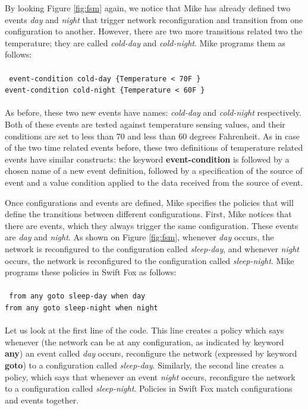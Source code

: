 \documentclass[11pt]{article}
\begin{document}
By looking Figure \ref{fig:fsm} again, we notice that Mike has already
defined two events \textit{day} and \textit{night} that trigger network
reconfiguration and transition from one configuration to another. However, 
there are two more transitions related two the temperature; they are called
\textit{cold-day} and \textit{cold-night}. Mike programs them as follows:\\
\\
\texttt{
event-condition cold-day \{Temperature < 70F \}				\\
event-condition cold-night \{Temperature < 60F \}			\\
}\\
As before, these two new events have names: \textit{cold-day} and
\textit{cold-night} respectively. Both of these events are tested against
temperature sensing values, and their conditions are set to less than 70
and less than 60 degrees Fahrenheit. As in case of the two time related
events before, these two definitions of temperature related events have
similar constructs: the keyword \textbf{event-condition} is followed by a
chosen name of a new event definition, followed by a specification of the
source of event and a value condition applied to the data received from the
source of event.

Once configurations and events are defined, Mike specifies the policies
that will define the transitions between different configurations. First,
Mike notices that there are events, which they always trigger the same
configuration. These events are \textit{day} and \textit{night}. As shown
on Figure \ref{fig:fsm}, whenever \textit{day} occurs, the network is
reconfigured to the configuration called \textit{sleep-day}, and whenever
\textit{night} occurs, the network is reconfigured to the configuration
called \textit{sleep-night}. Mike programs these policies in Swift Fox as
follows:								\\
\\
\texttt{
from any goto sleep-day when day					\\
from any goto sleep-night when night					\\
}\\
Let us look at the first line of the code. This line creates a policy which
says whenever (the network can be at any configuration, as indicated by
keyword \textbf{any}) an event called \textit{day} occurs, reconfigure the 
network (expressed by keyword \textbf{goto}) to a configuration called
\textit{sleep-day}. Similarly, the second line creates a policy, which says
that whenever an event \textit{night} occurs, reconfigure the network to a 
configuration called \textit{sleep-night}. Policies in Swift Fox match
configurations and events together. 
\end{document}
